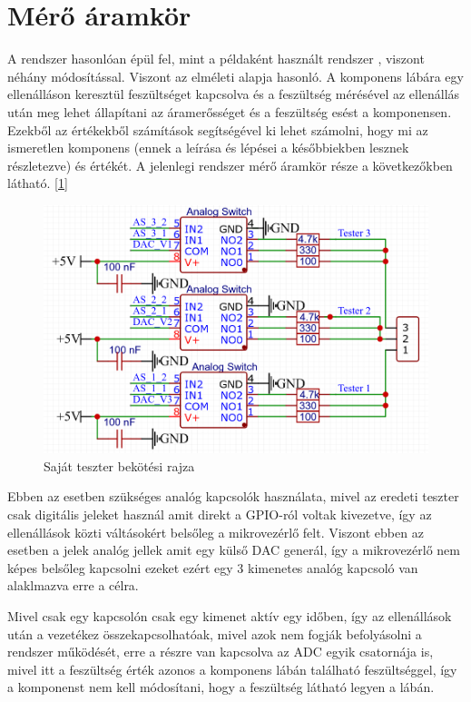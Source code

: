 
\section{Mérő áramkör}

A rendszer hasonlóan épül fel, mint a példaként használt rendszer \cite{similarSystem}, viszont néhány módosítással.
Viszont az elméleti alapja hasonló. A komponens lábára egy ellenálláson keresztül feszültséget kapcsolva és a 
feszültség mérésével az ellenállás után meg lehet állapítani az áramerősséget és a feszültség esést a komponensen.
Ezekből az értékekből számítások segítségével ki lehet számolni, hogy mi az ismeretlen komponens (ennek a leírása
és lépései a későbbiekben lesznek részletezve) és értékét. A jelenlegi rendszer mérő áramkör része a következőkben
látható. [\ref{fig:ownTesterConnection}]

\begin{figure}[H]
    \centering
    \includegraphics[scale=0.3]{figures/images/literature/TeszterConnections.png}
    \caption{Saját teszter bekötési rajza}
    \label{fig:ownTesterConnection}
\end{figure}

Ebben az esetben szükséges analóg kapcsolók használata, mivel az eredeti
teszter csak digitális jeleket használ amit direkt a GPIO-ról voltak kivezetve,
így az ellenállások közti váltásokért belsőleg a mikrovezérlő felt. Viszont ebben
az esetben a jelek analóg jellek amit egy külső DAC generál, így a mikrovezérlő nem
képes belsőleg kapcsolni ezeket ezért egy 3 kimenetes analóg kapcsoló van alaklmazva
erre a célra.

Mivel csak egy kapcsolón csak egy kimenet aktív egy időben, így az ellenállások után
a vezetékez összekapcsolhatóak, mivel azok nem fogják befolyásolni a rendszer működését,
erre a részre van kapcsolva az ADC egyik csatornája is, mivel itt a feszültség érték
azonos a komponens lábán található feszültséggel, így a komponenst nem kell módosítani,
hogy a feszültség látható legyen a lábán.


